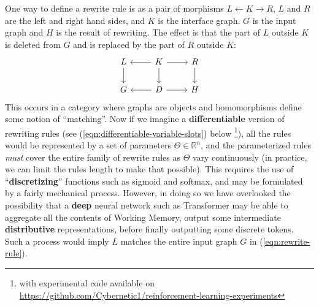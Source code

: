 \documentclass[runningheads]{llncs}
\begin{document}
One way to define a rewrite rule \cite{Kennaway1993} is as a pair of morphisms $L \leftarrow K \rightarrow R$, $L$ and $R$ are the left and right hand sides, and $K$ is the interface graph.  $G$ is the input graph and $H$ is the result of rewriting.  The effect is that the part of $L$ outside $K$ is deleted from $G$ and is replaced by the part of $R$ outside $K$:
\begin{equation}
	\label{eqn:rewrite-rule}
	\begin{tikzcd}
		L \arrow[d] & K \arrow[l] \arrow[d] \arrow[r] & R \arrow[d] \\
		G & D \arrow[l] \arrow[r] & H
	\end{tikzcd}
\end{equation}
This occurs in a category where graphs are objects and homomorphisms define some notion of ``matching''.  Now if we imagine a \textbf{differentiable} version of rewriting rules (see (\ref{eqn:differentiable-variable-slots}) below \footnote{with experimental code available on \href{https://github.com/Cybernetic1/reinforcement-learning-experiments}{https://github.com/Cybernetic1/reinforcement-learning-experiments}}), all the rules would be represented by a set of parameters $\Theta \in \mathbb{R}^n$, and the parameterized rules \textit{must} cover the entire family of rewrite rules as $\Theta$ vary continuously (in practice, we can limit the rules length to make that possible).  This requires the use of ``\textbf{discretizing}'' functions such as sigmoid and softmax, and may be formulated by a fairly mechanical process.  However, in doing so we have overlooked the possibility that a \textbf{deep} neural network such as Transformer may be able to aggregate all the contents of Working Memory, output some intermediate \textbf{distributive} representations, before finally outputting some discrete tokens.  Such a process would imply $L$ matches the entire input graph $G$ in (\ref{eqn:rewrite-rule}).

\end{document}
